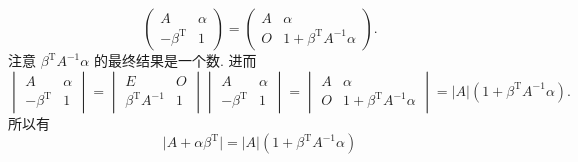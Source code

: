 \begin{enumerate}
\[\begin{pmatrix}
                  A                   & \alpha \\
                  -\beta^{\mathrm{T}} & 1
              \end{pmatrix} = \begin{pmatrix}
                  A & \alpha                           \\
                  O & 1+\beta^{\mathrm{T}}A^{-1}\alpha
              \end{pmatrix}.\]
          注意 $\beta^{\mathrm{T}}A^{-1}\alpha$ 的最终结果是一个数. 进而
          \[\begin{vmatrix}
                  A                   & \alpha \\
                  -\beta^{\mathrm{T}} & 1
              \end{vmatrix} = \begin{vmatrix}
                  E                        & O \\
                  \beta^{\mathrm{T}}A^{-1} & 1
              \end{vmatrix} \begin{vmatrix}
                  A                   & \alpha \\
                  -\beta^{\mathrm{T}} & 1
              \end{vmatrix} = \begin{vmatrix}
                  A & \alpha                           \\
                  O & 1+\beta^{\mathrm{T}}A^{-1}\alpha
              \end{vmatrix} = \lvert A \rvert(1+\beta^{\mathrm{T}}A^{-1}\alpha).\]
          所以有
          \[\lvert A+\alpha \beta^{\mathrm{T}} \rvert = \lvert A \rvert(1+\beta^{\mathrm{T}}A^{-1}\alpha)\]


\end{enumerate}
